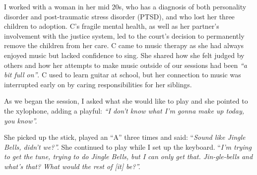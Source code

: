 \documentclass[authordate, empirical]{jote-new-article}
\begin{document}
I worked with a woman in her mid 20s, who has a diagnosis of both personality disorder and post-traumatic stress disorder (PTSD), and who lost her three children to adoption. C's fragile mental health, as well as her partner's involvement with the justice system, led to the court's decision to permanently remove the children from her care. C came to music therapy as she had always enjoyed music but lacked confidence to sing. She shared how she felt judged by others and how her attempts to make music outside of our sessions had been \emph{“a bit full on”}. C used to learn guitar at school, but her connection to music was interrupted early on by caring responsibilities for her siblings.







As we began the session, I asked what she would like to play and she pointed to the xylophone, adding a playful: \emph{“I don't know what I'm gonna make up today, you know”. }



She picked up the stick, played an “A” three times and said: “\emph{Sound like Jingle Bells, didn't we?”. }She continued to play while I set up the keyboard. “\emph{I'm trying to get the tune, trying to do Jingle Bells, but I can only get that. Jin-gle-bells and what's that? What would the rest of [it] be?”.}
\end{document}
